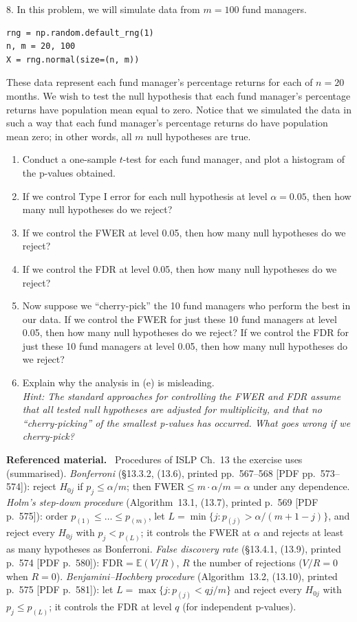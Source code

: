 \documentclass[11pt,a4paper]{article}
\numberwithin{equation}{questao}   %
\newenvironment{refmat}{\par\smallskip\noindent\small\textbf{Referenced material.}\ }{\par\smallskip}
\newcommand{\E}{\mathbb{E}}
\begin{document}
8. In this problem, we will simulate data from $m=100$ fund managers.
{\small
\begin{verbatim}
rng = np.random.default_rng(1)
n, m = 20, 100
X = rng.normal(size=(n, m))
\end{verbatim}
}
These data represent each fund manager's percentage returns for each of $n=20$ months. We wish to
test the null hypothesis that each fund manager's percentage returns have population mean equal to
zero. Notice that we simulated the data in such a way that each fund manager's percentage returns do
have population mean zero; in other words, all $m$ null hypotheses are true.
\begin{enumerate}[label=(\alph*),leftmargin=2.4em]
\item Conduct a one-sample $t$-test for each fund manager, and plot a histogram of the p-values
obtained.
\item If we control Type I error for each null hypothesis at level $\alpha=0.05$, then how many null
hypotheses do we reject?
\item If we control the FWER at level 0.05, then how many null hypotheses do we reject?
\item If we control the FDR at level 0.05, then how many null hypotheses do we reject?
\item Now suppose we ``cherry-pick'' the 10 fund managers who perform the best in our data. If we
control the FWER for just these 10 fund managers at level 0.05, then how many null hypotheses do we
reject? If we control the FDR for just these 10 fund managers at level 0.05, then how many null
hypotheses do we reject?
\item Explain why the analysis in (e) is misleading.\\
\textit{Hint: The standard approaches for controlling the FWER and FDR assume that all tested null
hypotheses are adjusted for multiplicity, and that no ``cherry-picking'' of the smallest p-values has
occurred. What goes wrong if we cherry-pick?}
\end{enumerate}
\begin{refmat}
Procedures of ISLP Ch.~13 the exercise uses (summarised). \emph{Bonferroni} (§13.3.2, (13.6),
printed pp.~567--568 [PDF pp.~573--574]): reject $H_{0j}$ if $p_j\le\alpha/m$; then
$\mathrm{FWER}\le m\cdot\alpha/m=\alpha$ under any dependence. \emph{Holm's step-down procedure}
(Algorithm~13.1, (13.7), printed p.~569 [PDF p.~575]): order $p_{(1)}\le\dots\le p_{(m)}$, let
$L=\min\{j:p_{(j)}>\alpha/(m+1-j)\}$, and reject every $H_{0j}$ with $p_j<p_{(L)}$; it controls the
FWER at $\alpha$ and rejects at least as many hypotheses as Bonferroni. \emph{False discovery rate}
(§13.4.1, (13.9), printed p.~574 [PDF p.~580]): $\mathrm{FDR}=\E(V/R)$, $R$ the number of rejections
($V/R=0$ when $R=0$). \emph{Benjamini--Hochberg procedure} (Algorithm~13.2, (13.10), printed p.~575
[PDF p.~581]): let $L=\max\{j:p_{(j)}<qj/m\}$ and reject every $H_{0j}$ with $p_j\le p_{(L)}$; it
controls the FDR at level $q$ (for independent p-values).
\end{refmat}
\end{document}
